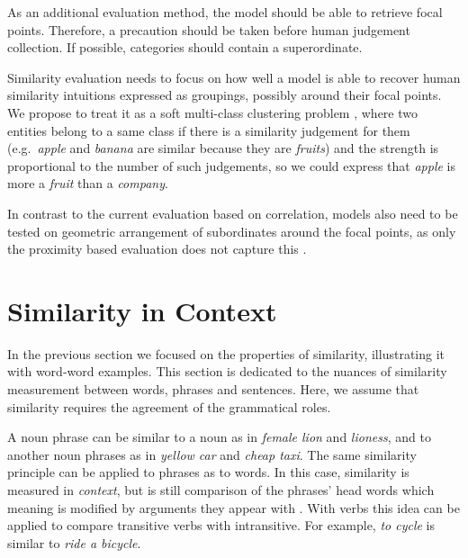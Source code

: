 \documentclass[11pt]{article}
\begin{document}
As an additional evaluation method, the model should be able to retrieve focal points. Therefore, a precaution should be taken before human judgement collection. If possible, categories should contain a superordinate.

Similarity evaluation needs to focus on how well a model is able to recover human similarity intuitions expressed as groupings, possibly around their focal points. We propose to treat it as a soft multi-class clustering problem \cite{White:2015:WSE:2838931.2838932}, where two entities belong to a same class if there is a similarity judgement for them (e.g.~\textit{apple} and \textit{banana} are similar because they are \textit{fruits}) and the strength is proportional to the number of such judgements, so we could express that \textit{apple} is more a \textit{fruit} than a \textit{company}.

In contrast to the current evaluation based on correlation, models also need to be tested on geometric arrangement of subordinates around the focal points, as only the proximity based evaluation does not capture this \cite{1986-13502-00119860101}.

\section{Similarity in Context}

In the previous section we focused on the properties of similarity, illustrating it with word-word examples. This section is dedicated to the nuances of similarity measurement between words, phrases and sentences. Here, we assume that similarity requires the agreement of the grammatical roles.

A noun phrase can be similar to a noun as in \textit{female lion} and \textit{lioness}, and to another noun phrases as in \textit{yellow car} and \textit{cheap taxi}. The same similarity principle can be applied to phrases as to words. In this case, similarity is measured in \emph{context}, but is still comparison of the phrases' head words which meaning is modified by arguments they appear with \cite{Kintsch2001173,mitchell-lapata:2008:ACLMain,mitchell2010composition,Dinu:2010:MDS:1870658.1870771,Baroni2010nouns,thater-furstenau-pinkal:2011:IJCNLP-2011,Seaghdha:2011:PMS:2145432.2145545}. With verbs this idea can be applied to compare transitive verbs with intransitive. For example, \textit{to cycle} is similar to \textit{ride a bicycle}.

\end{document}
